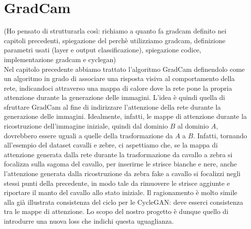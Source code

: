 \section{GradCam}
(Ho pensato di strutturarla così: richiamo a quanto fa gradcam definito nei capitoli precedenti, spiegazione del perchè utilizziamo gradcam, definizione parametri usati (layer e output classificazione), spiegazione codice, implementazione gradcam e cyclegan)\\
Nel capitolo precedente abbiamo trattato l'algoritmo GradCam definendolo come un algoritmo in grado di associare una risposta visiva al comportamento della rete, indicandoci attraverso una mappa di calore dove la rete pone la propria attenzione durante la generazione delle immagini. L'idea è quindi quella di sfruttare GradCam al fine di indirizzare l'attenzione della rete durante la generazione delle immagini. Idealmente, infatti, le mappe di attenzione durante la ricostruzione dell'immagine iniziale, quindi dal dominio $B$ al dominio $A$, dovrebbero essere uguali a quelle della trasformazione da $A$ a $B$. Infatti, tornando all'esempio del dataset cavalli e zebre, ci aspettiamo che, se la mappa di attenzione generata dalla rete durante la trasformazione da cavallo a zebra si focalizza sulla sagoma del cavallo, per inserirne le strisce bianche e nere, anche l'attenzione generata dalla ricostruzione da zebra fake a cavallo si focalizzi negli stessi punti della precedente, in modo tale da rimuovere le strisce aggiunte e riportare il manto del cavallo allo stato iniziale. Il ragionamento è molto simile alla già illustrata consistenza del ciclo per le CycleGAN: deve esserci consistenza tra le mappe di attenzione. Lo scopo del nostro progetto è dunque quello di introdurre una nuova loss che indichi questa uguaglianza. 

